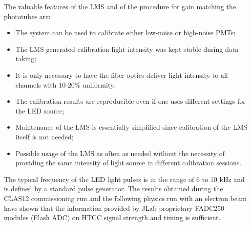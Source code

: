 The valuable features of the LMS and of the procedure for gain matching the phototubes are:
 
 \begin{itemize}
     \item The system can be used to calibrate either low-noise or high-noise PMTs;
     \item The LMS generated calibration light intensity was kept stable during data taking;
     \item It is only necessary to have the fiber optics deliver light intensity to all channels with 10-20\% uniformity;
     \item The calibration results are reproducible even if one uses different settings for the LED source;
     \item Maintenance of the LMS is essentially simplified since calibration of the LMS itself is not needed;
     \item Possible usage of the LMS as often as needed without the necessity of providing the same intensity of light
       source in different calibration sessions.
 \end{itemize}

The typical frequency of the LED light pulses is in the range of 6 to 10 kHz and is defined by a standard pulse
generator. The results obtained during the CLAS12 commissioning run and the following physics run with an
electron beam have shown that the information provided by JLab proprietary FADC250 modules (Flash ADC)
\cite{daq-nim} on HTCC signal strength and timing is sufficient. 

